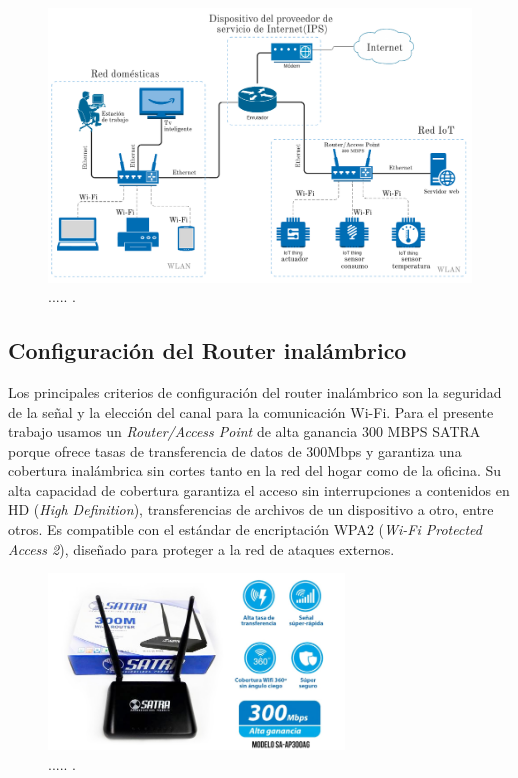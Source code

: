 \begin{landscape} %
\begin{figure}[htpb]
\centering 
\includegraphics[width=1.455\textwidth]{./Figures/rediot.png}
\caption{..... .}
\label{fig:diagramared}
\end{figure}
\end{landscape} %

\subsection{Configuración del Router inalámbrico}
Los principales criterios de configuración del router inalámbrico son la seguridad de la señal y la elección del canal para la comunicación Wi-Fi.
Para el presente trabajo usamos un \emph{Router/Access Point} de alta ganancia 300 MBPS SATRA porque ofrece tasas de transferencia de datos de 300Mbps y garantiza una cobertura inalámbrica sin cortes tanto en la red del hogar como de la oficina. Su alta capacidad de cobertura garantiza el acceso sin interrupciones a contenidos en HD (\emph{High Definition}), transferencias de archivos de un dispositivo a otro, entre otros. Es compatible con el estándar de encriptación WPA2 (\emph{Wi-Fi Protected Access 2}), diseñado para proteger a la red de ataques externos. 

\begin{figure}[htpb]
\centering 
\includegraphics[width=0.7\textwidth]{./Figures/router.jpg}
\caption{..... .}
\label{fig:router}
\end{figure}


